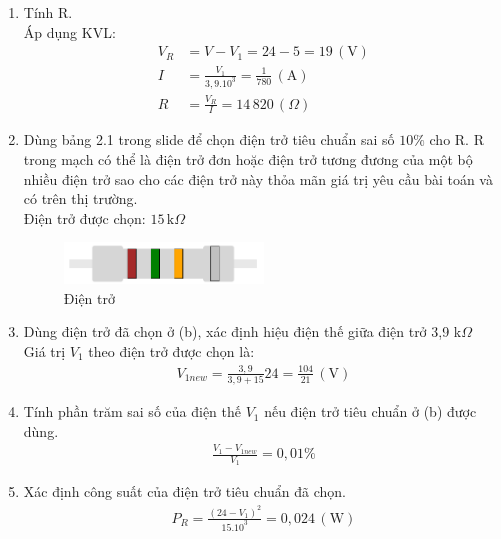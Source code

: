 \begin{enumerate}[label=\alph*.]
    \item Tính R.\\
          Áp dụng KVL:
          \begin{align*}
              V_R & = V - V_{1} = 24 - 5 = 19 \, (\text{V})                  \\
              I   & = \frac{V_{1}}{3,9.10^{3}} = \frac{1}{780} \, (\text{A}) \\
              R   & = \frac{V_{R}}{I} = 14\,820 \, (\Omega)
          \end{align*}
    \item Dùng bảng 2.1 trong slide để chọn điện trở tiêu chuẩn sai số \(10 \%\) cho R. R trong mạch có thể là điện trở đơn hoặc điện trở tương đương của một bộ nhiều điện trở sao cho các điện trở này thỏa mãn giá trị yêu cầu bài toán và có trên thị trường.\\
          Điện trở được chọn: \(15 \, \text{k} \Omega\)
          \begin{figure}[!htbp]
              \centering
              \includegraphics[width=0.5\textwidth]{graphics/ex5/f2.PNG}
              \caption{Điện trở}
          \end{figure}

          \pagebreak

    \item Dùng điện trở đã chọn ở (b), xác định hiệu điện thế giữa điện trở 3,9 k$\Omega$\\
          Giá trị $V_{1}$ theo điện trở được chọn là:
          \begin{align*}
              V_{1new} = \frac{3,9}{3,9+15}24=\frac{104}{21} \, (\text{V})
          \end{align*}
    \item Tính phần trăm sai số của điện thế $V_{1}$ nếu điện trở tiêu chuẩn ở (b) được dùng.
          \begin{align*}
              \frac{V_{1} - V_{1new}}{V_{1}} = 0,01 \%
          \end{align*}
    \item Xác định công suất của điện trở tiêu chuẩn đã chọn.
          \begin{align*}
              P_{R} = \frac{(24 - V_{1})^{2}}{15.10^{3}} = 0,024 \, (\text{W})
          \end{align*}
\end{enumerate}

